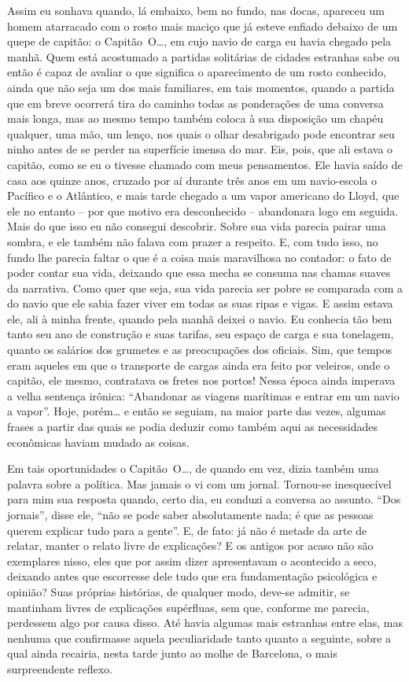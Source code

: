 Assim eu sonhava quando, lá embaixo, bem no fundo, nas docas, apareceu
um homem atarracado com o rosto mais maciço que já esteve enfiado
debaixo de um quepe de capitão: o Capitão~O\ldots{}, em cujo navio de carga
eu havia chegado pela manhã. Quem está acostumado a partidas solitárias
de cidades estranhas sabe ou então é capaz de avaliar o que significa o
aparecimento de um rosto conhecido, ainda que não seja um dos mais
familiares, em tais momentos, quando a partida que em breve ocorrerá
tira do caminho todas as ponderações de uma conversa mais longa, mas ao
mesmo tempo também coloca à sua disposição um chapéu qualquer, uma mão,
um lenço, nos quais o olhar desabrigado pode encontrar seu ninho antes
de se perder na superfície imensa do mar. Eis, pois, que ali estava o
capitão, como se eu o tivesse chamado com meus pensamentos. Ele havia
saído de casa aos quinze anos, cruzado por aí durante três anos em um
navio-escola o Pacífico e o Atlântico, e mais tarde chegado a um vapor
americano do Lloyd, que ele no entanto -- por que motivo era
desconhecido -- abandonara logo em seguida. Mais do que isso eu não
consegui descobrir. Sobre sua vida parecia pairar uma sombra, e ele
também não falava com prazer a respeito. E, com tudo isso, no fundo lhe
parecia faltar o que é a coisa mais maravilhosa no contador: o fato de
poder contar sua vida, deixando que essa mecha se consuma nas chamas
suaves da narrativa. Como quer que seja, sua vida parecia ser pobre se
comparada com a do navio que ele sabia fazer viver em todas as suas
ripas e vigas. E assim estava ele, ali à minha frente, quando pela manhã
deixei o navio. Eu conhecia tão bem tanto seu ano de construção e suas
tarifas, seu espaço de carga e sua tonelagem, quanto os salários dos
grumetes e as preocupações dos oficiais. Sim, que tempos eram aqueles em
que o transporte de cargas ainda era feito por veleiros, onde o capitão,
ele mesmo, contratava os fretes nos portos! Nessa época ainda imperava a
velha sentença irônica: ``Abandonar as viagens marítimas e entrar em um
navio a vapor''. Hoje, porém\ldots{} e então se seguiam, na maior parte das
vezes, algumas frases a partir das quais se podia deduzir como também
aqui as necessidades econômicas haviam mudado as coisas.

Em tais oportunidades o Capitão~O\ldots{}, de quando em vez, dizia também uma
palavra sobre a política. Mas jamais o vi com um jornal. Tornou-se
inesquecível para mim sua resposta quando, certo dia, eu conduzi a
conversa ao assunto. ``Dos jornais'', disse ele, ``não se pode saber
absolutamente nada; é que as pessoas querem explicar tudo para a
gente''. E, de fato: já não é metade da arte de relatar, manter o relato
livre de explicações? E os antigos por acaso não são exemplares nisso,
eles que por assim dizer apresentavam o acontecido a seco, deixando
antes que escorresse dele tudo que era fundamentação psicológica e
opinião? Suas próprias histórias, de qualquer modo, deve-se admitir, se
mantinham livres de explicações supérfluas, sem que, conforme me
parecia, perdessem algo por causa disso. Até havia algumas mais
estranhas entre elas, mas nenhuma que confirmasse aquela peculiaridade
tanto quanto a seguinte, sobre a qual ainda recairia, nesta tarde junto
ao molhe de Barcelona, o mais surpreendente reflexo.

